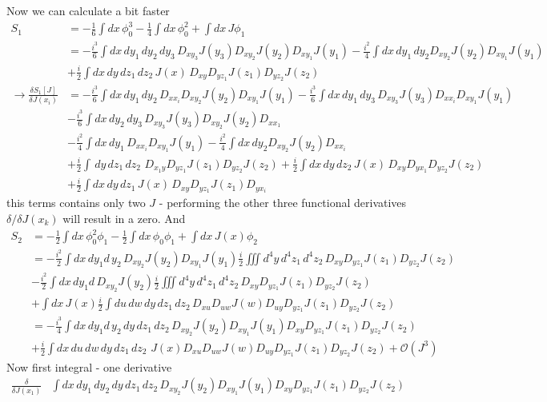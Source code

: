\documentclass[10pt,a4paper]{article}
\theoremstyle{definition}
\begin{document}
\begin{enumerate}[1)]
Now we can calculate a bit faster
\begin{align}
S_1&=-\frac{1}{6}\int dx\,\phi_0^3-\frac{1}{4}\int dx\,\phi_0^2+\int dx\,J\phi_1\\
&=-\frac{i^3}{6}\int dx\,dy_1\,dy_2\,dy_3\,D_{xy_3}J(y_3)D_{xy_2}J(y_2)D_{xy_1}J(y_1)
-\frac{i^2}{4}\int dx\,dy_1\,dy_2D_{xy_2}J(y_2)D_{xy_1}J(y_1)\\& 
+\frac{i}{2}\int dx\,dy\,dz_1\,dz_2\,J(x)\,D_{xy}D_{yz_1} J(z_1)D_{yz_2} J(z_2)\\
\rightarrow\frac{\delta S_1[J]}{\delta J(x_i)}
&=-\frac{i^3}{6}\int dx\,dy_1\,dy_2\,D_{xx_i}D_{xy_2}J(y_2)D_{xy_1}J(y_1)
-\frac{i^3}{6}\int dx\,dy_1\,dy_3\,D_{xy_3}J(y_3)D_{xx_i}D_{xy_1}J(y_1)\\
&-\frac{i^3}{6}\int dx\,dy_2\,dy_3\,D_{xy_3}J(y_3)D_{xy_2}J(y_2)D_{xx_1}\\
&-\frac{i^2}{4}\int dx\,dy_1\,D_{xx_i}D_{xy_1}J(y_1)-\frac{i^2}{4}\int dx\,dy_2D_{xy_2}J(y_2)D_{xx_i}\\
&+\frac{i}{2}\int \,dy\,dz_1\,dz_2\,\,D_{x_1y}D_{yz_1} J(z_1)D_{yz_2} J(z_2)
+\frac{i}{2}\int dx\,dy\,dz_2\,J(x)\,D_{xy}D_{yx_1}D_{yz_2} J(z_2)\\
&+\frac{i}{2}\int dx\,dy\,dz_1\,J(x)\,D_{xy}D_{yz_1} J(z_1)D_{yx_i}
\end{align}
this terms contains only two $J$ - performing the other three functional derivatives $\delta/\delta J(x_k)$ will result in a zero.
And
\begin{align}
S_2&=-\frac{1}{2}\int dx\,\phi_0^2\phi_1-\frac{1}{2}\int dx\,\phi_0\phi_1+\int dx\,J(x)\phi_2\\
&=-\frac{i^2}{2}\int dx\,dy_1d\,y_2\,D_{xy_2}J(y_2)D_{xy_1}J(y_1)\frac{i}{2}\iiint d^4y\,d^4z_1\,d^4z_2\,D_{xy}D_{yz_1}J(z_1)D_{yz_2}J(z_2)\\
&-\frac{i^2}{2}\int dx\,dy_1d\,D_{xy_2}J(y_2)\frac{i}{2}\iiint d^4y\,d^4z_1\,d^4z_2\,D_{xy}D_{yz_1}J(z_1)D_{yz_2}J(z_2)\\
&+\int dx\,J(x)\frac{i}{2}\int du\,dw\,dy\,dz_1\,dz_2\,D_{xu}D_{uw}J(w)D_{uy}D_{yz_1}J(z_1)D_{yz_2}J(z_2)\\
&=-\frac{i^3}{4}\int dx\,dy_1d\,y_2\,dy\,dz_1\,dz_2\,D_{xy_2}J(y_2)D_{xy_1}J(y_1) D_{xy}D_{yz_1}J(z_1)D_{yz_2}J(z_2)\\
&+\frac{i}{2}\int dx\,du\,dw\,dy\,dz_1\,dz_2\,\,J(x)D_{xu}D_{uw}J(w)D_{uy}D_{yz_1}J(z_1)D_{yz_2}J(z_2)+\mathcal{O}(J^3)
\end{align}
Now first integral - one derivative
\begin{align}
\frac{\delta}{\delta J(x_1)}&\int dx\,dy_1\,dy_2\,dy\,dz_1\,dz_2\,D_{xy_2}J(y_2)D_{xy_1}J(y_1) D_{xy}D_{yz_1}J(z_1)D_{yz_2}J(z_2)\\

\end{align}
\end{enumerate}
\end{document}
